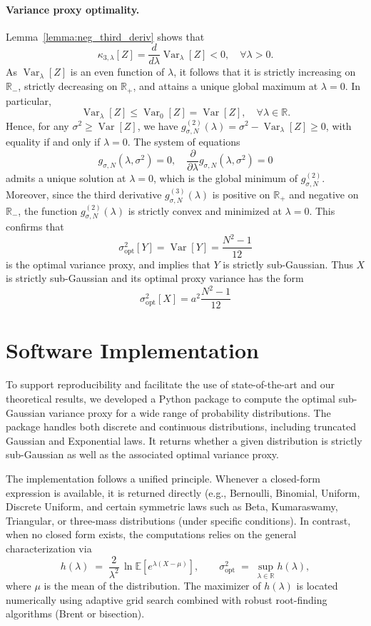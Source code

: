 \documentclass[a4paper, 10pt]{article}
\newcommand{\beq}{\begin{equation}}
\newcommand{\eeq}{\end{equation}}
\theoremstyle{definition}
\begin{document}
\paragraph{Variance proxy optimality.}
Lemma~\ref{lemma:neg_third_deriv} shows that
\[
\kappa_{3,\lambda}[Z] = \frac{d}{d\lambda}\operatorname{Var}_{\lambda}[Z] < 0, \quad \forall \lambda > 0.
\]
As \( \operatorname{Var}_{\lambda}[Z] \) is an even function of \( \lambda \), it follows that it is strictly increasing on \( \mathbb{R}_- \), strictly decreasing on \( \mathbb{R}_+ \), and attains a unique global maximum at \( \lambda = 0 \). In particular,
\[
\operatorname{Var}_{\lambda}[Z] \leq \operatorname{Var}_0[Z] = \operatorname{Var}[Z], \quad \forall \lambda \in \mathbb{R}.
\]
Hence, for any \( \sigma^2 \geq \operatorname{Var}[Z] \), we have \( g_{\sigma,N}^{(2)}(\lambda) = \sigma^2 - \operatorname{Var}_\lambda[Z] \geq 0 \), with equality if and only if \( \lambda = 0 \). The system of equations
\[
g_{\sigma,N}(\lambda,\sigma^2) = 0, \quad \frac{\partial}{\partial \lambda} g_{\sigma,N}(\lambda,\sigma^2) = 0
\]
admits a unique solution at \( \lambda = 0 \), which is the global minimum of \( g_{\sigma,N}^{(2)} \). Moreover, since the third derivative \( g_{\sigma, N}^{(3)}(\lambda) \) is positive on \( \mathbb{R}_+ \) and negative on \( \mathbb{R}_- \), the function \( g_{\sigma, N}^{(2)}(\lambda) \) is strictly convex and minimized at \( \lambda = 0 \). This confirms that
\beq 
\sigma^2_{\mathrm{opt}}[Y] = \operatorname{Var}[Y] = \frac{N^2 - 1}{12}
\eeq
is the optimal variance proxy, and implies that \( Y \) is strictly sub-Gaussian. Thus \(X\) is strictly sub-Gaussian and its optimal proxy variance has the form \beq \sigma^2_{\mathrm{opt}}[X] = a^2 \frac{N^2 - 1}{12} \eeq 

\section{Software Implementation}
To support reproducibility and facilitate the use of state-of-the-art and our theoretical results, 
we developed a Python package to compute the optimal sub-Gaussian variance proxy for a wide range of probability distributions. 
The package handles both discrete and continuous distributions, including truncated Gaussian and Exponential laws. 
It returns whether a given distribution is strictly sub-Gaussian as well as the associated optimal variance proxy. 

The implementation follows a unified principle. 
Whenever a closed-form expression is available, it is returned directly (e.g., Bernoulli, Binomial, Uniform, Discrete Uniform, and certain symmetric laws such as Beta, Kumaraswamy, Triangular, or  three-mass distributions (under specific conditions). 
In contrast, when no closed form exists, the computations relies on the general characterization via
\[
h(\lambda) \;=\; \frac{2}{\lambda^{2}} \, \ln \mathbb{E}\!\left[e^{\lambda(X-\mu)}\right],
\qquad 
\sigma^2_{\text{opt}} \;=\; \sup_{\lambda \in \mathbb{R}} h(\lambda),
\]
where $\mu$ is the mean of the distribution. 
The maximizer of $h(\lambda)$ is located numerically using adaptive grid search combined with robust root-finding algorithms (Brent or bisection). 
\end{document}
